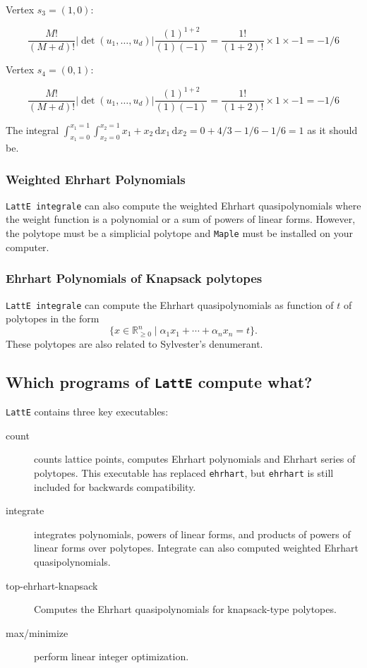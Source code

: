 \documentclass{article}
\newcommand{\R}{{\mathbb R}}
\newcommand{\latte}{{\tt LattE}\xspace}
\newcommand{\latteInt}{{\tt LattE integrale}\xspace}
\newcommand{\maple}{{\tt Maple}\xspace}
\renewcommand\d{\,\mathrm{d}}
\begin{document}
Vertex $s_3 = (1,0)$: 
        
\begin{displaymath}
 \frac{M!}{(M+d)!} |\det(u_1, \dots, u_d)| \frac{(1)^{1+2}}{(1)(-1)} = \frac{1!}{(1+2)!} \times 1 \times -1 = -1/6
\end{displaymath}


Vertex $s_4 = (0,1):$ 


\begin{displaymath}
 \frac{M!}{(M+d)!} |\det(u_1, \dots, u_d)| \frac{(1)^{1+2}}{(1)(-1)} = \frac{1!}{(1+2)!} \times 1 \times -1 = -1/6
\end{displaymath}

The integral $\int_{x_1 = 0}^{x_1 = 1}\int_{x_2 = 0}^{x_2 = 1} x_1 +x_2  \d{x_1}\d{x_2} = 0 + 4/3 -1/6 - 1/6 = 1$ as it should be.

\subsubsection{Weighted Ehrhart Polynomials}

\latteInt can also compute the weighted Ehrhart quasipolynomials where the weight function is a polynomial or a sum of powers of linear forms. However, the polytope must be a simplicial polytope and \maple must be installed on your computer.


\subsubsection{Ehrhart Polynomials of Knapsack polytopes}

\latteInt can compute the Ehrhart quasipolynomials as function of $t$ of polytopes in the form \[ \{x\in \R^n_{\geq 0} \mid \alpha_1 x_1 + \cdots + \alpha_n x_n = t\}.\]
These polytopes are also related to Sylvester's denumerant.


\subsection{Which programs of {\tt LattE} compute what?}

\latte contains three key executables:
\begin{description}
        \item[count] counts lattice points, computes Ehrhart polynomials and Ehrhart series of polytopes. This executable has replaced {\tt ehrhart}, but {\tt ehrhart} is still included for backwards compatibility.
        \item[integrate] integrates polynomials, powers of linear forms, and products of powers of linear forms over polytopes. Integrate can also computed weighted Ehrhart quasipolynomials.
        \item[top-ehrhart-knapsack] Computes the Ehrhart quasipolynomials for knapsack-type polytopes.
        \item[max/minimize] perform linear integer optimization.
\end{description}
\end{document}
